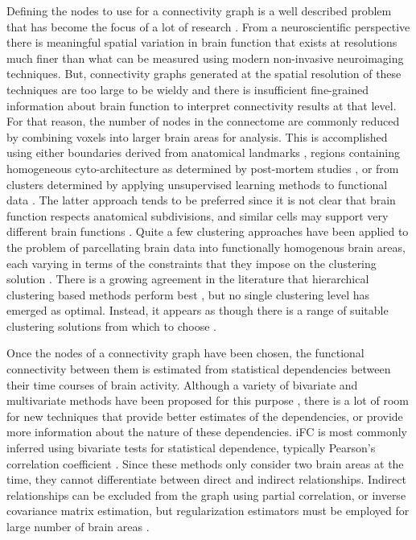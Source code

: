 Defining the nodes to use for a connectivity graph is a well described problem that has become the focus of a lot of research \cite{Thirion2014}. From a neuroscientific perspective there is meaningful spatial variation in brain function that exists at resolutions much finer than what can be measured using modern non-invasive neuroimaging techniques. But, connectivity graphs generated at the spatial resolution of these techniques are too large to be wieldy and there is insufficient fine-grained information about brain function to interpret connectivity results at that level. For that reason, the number of nodes in the connectome are commonly reduced by combining voxels into larger brain areas for analysis. This is accomplished using either boundaries derived from anatomical landmarks \cite{Desikan2006,AAL2002}, regions containing homogeneous cyto-architecture as determined by post-mortem studies \cite{Eickhoff2008}, or from clusters determined by applying unsupervised learning methods to functional data \cite{Bellec2006,Craddock2012}. The latter approach tends to be preferred since it is not clear that brain function respects anatomical subdivisions, and similar cells may support very different brain functions \cite{Craddock2012}. Quite a few clustering approaches have been applied to the problem of parcellating brain data into functionally homogenous brain areas, each varying in terms of the constraints that they impose on the clustering solution  \cite{Craddock2012,Blumensath2013,Bellec2006,Thirion2006,Zalesky2010,Flandin2002,Thirion2014}. There is a growing agreement in the literature that hierarchical clustering based methods perform best \cite{Blumensath2013,Thirion2014}, but no single clustering level has emerged as optimal. Instead, it appears as though there is a range of suitable clustering solutions from which to choose  \cite{Craddock2012,Thirion2014}.  


Once the nodes of a connectivity graph have been chosen, the functional connectivity between them is estimated from statistical dependencies between their time courses of brain activity. Although a variety of bivariate and multivariate methods have been proposed for this purpose \cite{Smith2011,Varoquaux2013}, there is a lot of room for new techniques that provide better estimates of the dependencies, or provide more information about the nature of these dependencies. iFC is most commonly inferred using bivariate tests for statistical dependence, typically Pearson's correlation coefficient \cite{Biswal1995}. Since these methods only consider two brain areas at the time, they cannot differentiate between direct and indirect relationships. Indirect relationships can be excluded from the graph using partial correlation, or inverse covariance matrix estimation, but regularization estimators must be employed for large number of brain areas \cite{Ryali2012,Varoquaux2013}. 

